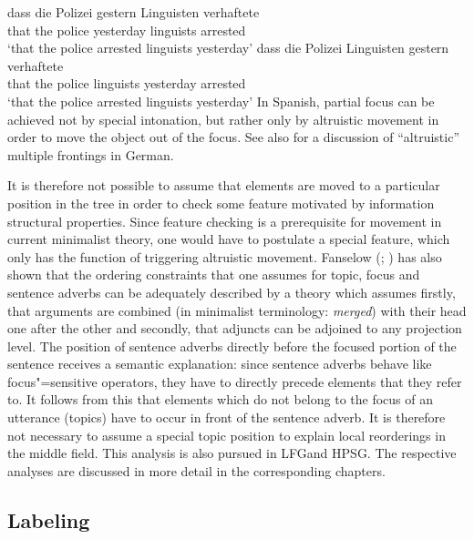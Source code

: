 \eal
\ex 
\gll dass die Polizei gestern Linguisten verhaftete\\
	 that the police yesterday linguists arrested\\
\glt `that the police arrested linguists yesterday'
\ex 
\gll dass die Polizei Linguisten gestern verhaftete\\
	 that the police linguists yesterday arrested\\
\glt `that the police arrested linguists yesterday'
\zl
%
In Spanish, partial focus can be achieved not by special intonation, but rather only by altruistic movement in order to move the
object out of the focus. See also  for a discussion of ``altruistic'' multiple frontings in German.

It is therefore not possible to assume that elements are moved to a particular position in the tree in order to check some feature motivated by
information structural properties. Since feature checking is a prerequisite for movement in current minimalist theory, one would have to postulate
a special feature, which only has the function of triggering altruistic movement. Fanselow (\citeyear[Section~4]{Fanselow2003b}; 
\citeyear[]{Fanselow2006a}) has also shown that the ordering constraints that one assumes for topic, focus and sentence adverbs can be
adequately described by a theory which assumes firstly, that arguments are combined (in minimalist terminology: 
\emph{merged}) with their head one after the other and secondly, that adjuncts can be adjoined to any projection level. The position of sentence adverbs directly before the
focused portion of the sentence receives a semantic explanation: since sentence adverbs behave like focus"=sensitive operators, they have to directly
precede elements that they refer to. It follows from this that elements which do not belong to the focus of an utterance (topics) have to occur
in front of the sentence adverb. It is therefore not necessary to assume a special topic position to explain local reorderings in the middle field.
This analysis is also pursued in LFG\indexlfg and HPSG\indexhpsg. The respective analyses are discussed in more detail in the corresponding chapters.
%



\subsection{Labeling}
\label{Abschnitt-Labeling}


